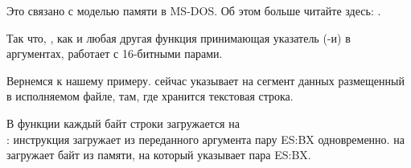 Это связано с моделью памяти в MS-DOS. Об этом больше читайте здесь: 
.

Так что, , как и любая другая функция принимающая указатель (-и) в аргументах,
работает с 16-битными парами.

Вернемся к нашему примеру.
 сейчас указывает на сегмент данных размещенный в исполняемом файле, там, где хранится текстовая строка.

В функции  каждый байт строки загружается на\\
: инструкция
 загружает из переданного аргумента пару ES:BX одновременно.
\MOV на  загружает байт из памяти, на который указывает пара ES:BX.

%
%

